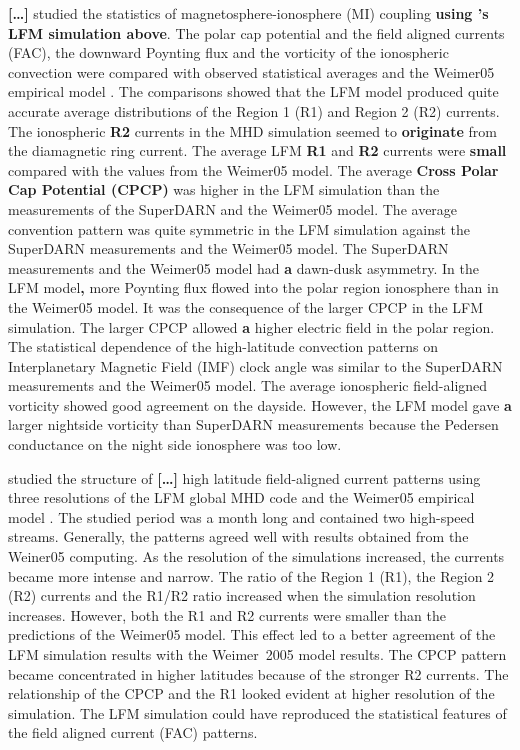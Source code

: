 \documentclass[linenumbers,draft]{agujournal}
\begin{document}
\citet{zhang11:_lyon_fedder_mobar_mhd} \textbf{[\dots]} studied the statistics of magnetosphere-ionosphere (MI) coupling \textbf{using \citet{guild08:_geotail_lfm1}'s LFM simulation above}. The polar cap potential and the field aligned currents (FAC), the downward Poynting flux and the vorticity of the ionospheric convection were compared with observed statistical averages and the Weimer05 empirical model \citep{weimer05:_improv_joule}. The comparisons showed that the LFM model produced quite accurate average distributions of the Region 1 (R1) and Region 2 (R2) currents. The ionospheric \textbf{R2} currents in the MHD simulation seemed to \textbf{originate} from the diamagnetic ring current. The average LFM \textbf{R1} and \textbf{R2} currents were \textbf{small} compared with the values from the Weimer05 model. The average \textbf{Cross Polar Cap Potential (CPCP)} was higher in the LFM simulation than the measurements of the SuperDARN and the Weimer05 model. The average convention pattern was quite symmetric in the LFM simulation against the SuperDARN measurements and the Weimer05 model. The SuperDARN measurements and the Weimer05 model had \textbf{a} dawn-dusk asymmetry. In the LFM model\textbf{,} more Poynting flux flowed into the polar region ionosphere than in the Weimer05 model. It was the consequence of the larger CPCP in the LFM simulation. The larger CPCP allowed \textbf{a} higher electric field in the polar region. The statistical dependence of the high-latitude convection patterns on Interplanetary Magnetic Field (IMF) clock angle was similar to the SuperDARN measurements \citep{sofko95:_direc_super} and the Weimer05 model. The average ionospheric field-aligned vorticity showed good agreement on the dayside. However, the LFM model gave \textbf{a} larger nightside vorticity than SuperDARN measurements because the Pedersen conductance on the night side ionosphere was too low. 

\citet{wiltberger17:_struc_high_latit_curren_magnet_ionos_model} studied the structure of \textbf{[\dots]} high latitude field-aligned current patterns using three resolutions of the LFM global MHD code and the Weimer05 empirical model \citep{weimer05:_improv_joule}. The studied period was a month long and contained two high-speed streams. Generally, the patterns agreed well with results obtained from the Weiner05 computing. As the resolution of the simulations increased, the currents became more intense and narrow. The ratio of the Region 1 (R1), the Region 2 (R2) currents and the R1/R2 ratio increased when the simulation resolution increases. However, both the R1 and R2 currents were smaller than the predictions of the Weimer05 model. This effect led to a better agreement of the LFM simulation results with the Weimer~2005 model results. The CPCP pattern became concentrated in higher latitudes because of the stronger R2 currents. The relationship of the CPCP and the R1 looked evident at higher resolution of the simulation. The LFM simulation could have reproduced the statistical features of the field aligned current (FAC) patterns. 
\end{document}
